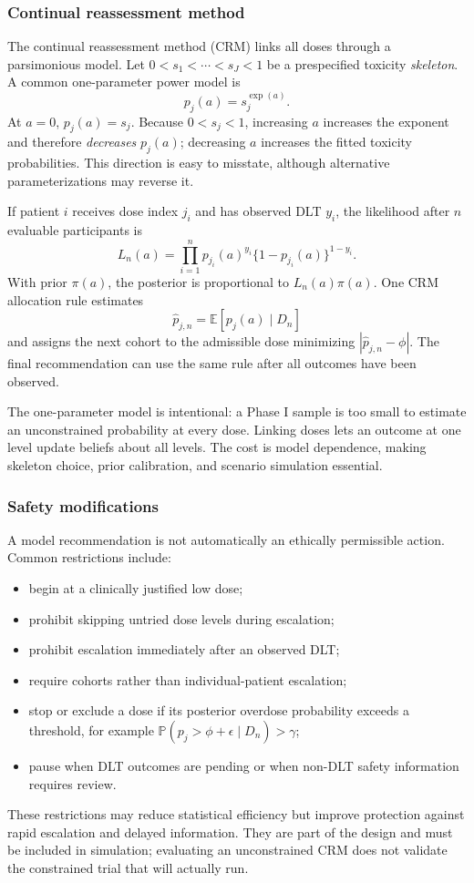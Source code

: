 \documentclass[12pt,oneside]{book}
\numberwithin{equation}{section}
\theoremstyle{definition}
\theoremstyle{plain}
\theoremstyle{remark}
\newcommand{\E}{\mathbb{E}}
\newcommand{\Prob}{\mathbb{P}}
\newcommand{\abs}[1]{\left\lvert #1 \right\rvert}
\begin{document}
\subsubsection{Continual reassessment method}

The continual reassessment method (CRM) links all doses through a parsimonious
model.  Let $0<s_1<\cdots<s_J<1$ be a prespecified toxicity \emph{skeleton}.  A
common one-parameter power model is
\begin{equation}
 p_j(a)=s_j^{\exp(a)}.
 \label{eq:crm-power-model}
\end{equation}
At $a=0$, $p_j(a)=s_j$.  Because $0<s_j<1$, increasing $a$ increases the
exponent and therefore \emph{decreases} $p_j(a)$; decreasing $a$ increases the
fitted toxicity probabilities.  This direction is easy to misstate, although
alternative parameterizations may reverse it.

If patient $i$ receives dose index $j_i$ and has observed DLT $y_i$, the
likelihood after $n$ evaluable participants is
\[
 L_n(a)=\prod_{i=1}^n
 p_{j_i}(a)^{y_i}\{1-p_{j_i}(a)\}^{1-y_i}.
\]
With prior $\pi(a)$, the posterior is proportional to $L_n(a)\pi(a)$.  One CRM
allocation rule estimates
\[
 \widehat p_{j,n}=\E[p_j(a)\mid D_n]
\]
and assigns the next cohort to the admissible dose minimizing
$\abs{\widehat p_{j,n}-\phi}$.  The final recommendation can use the same rule
after all outcomes have been observed.

The one-parameter model is intentional: a Phase I sample is too small to
estimate an unconstrained probability at every dose.  Linking doses lets an
outcome at one level update beliefs about all levels.  The cost is model
dependence, making skeleton choice, prior calibration, and scenario simulation
essential.

\subsubsection{Safety modifications}

A model recommendation is not automatically an ethically permissible action.
Common restrictions include:
\begin{itemize}
    \item begin at a clinically justified low dose;
    \item prohibit skipping untried dose levels during escalation;
    \item prohibit escalation immediately after an observed DLT;
    \item require cohorts rather than individual-patient escalation;
    \item stop or exclude a dose if its posterior overdose probability exceeds
    a threshold, for example
    $\Prob(p_j>\phi+\epsilon\mid D_n)>\gamma$;
    \item pause when DLT outcomes are pending or when non-DLT safety information
    requires review.
\end{itemize}
These restrictions may reduce statistical efficiency but improve protection
against rapid escalation and delayed information.  They are part of the design
and must be included in simulation; evaluating an unconstrained CRM does not
validate the constrained trial that will actually run.
\end{document}
